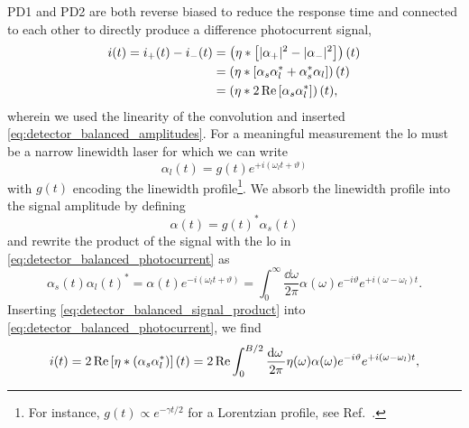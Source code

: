 PD1 and PD2 are both reverse biased to reduce the response time and connected to each other to directly produce a difference photocurrent signal,
\begin{equation}
	\begin{split}
		i(t)
		=
		i_+(t)
		-
		i_-(t)
		&=
		\left(
			\eta
			\ast
			\left[
				\lvert\alpha_+\rvert^2
				-
				\lvert\alpha_-\rvert^2
			\right]		
		\right)(t)
		\\
		&=
		\left(
			\eta
			\ast
			\left[
				\alpha_s
				\alpha_l^*
				+
				\alpha_s^*
				\alpha_l
			\right]
		\right)(t)
		\\
		&=
		\left(
			\eta
			\ast
			2\operatorname{Re}\left[
				\alpha_s
				\alpha_l^*
			\right]
		\right)(t)
		,
	\end{split}
	\label{eq:detector_balanced_photocurrent}
\end{equation}
wherein we used the linearity of the convolution and inserted \cref{eq:detector_balanced_amplitudes}.
For a meaningful measurement the \gls{lo} must be a narrow linewidth laser for which we can write
\begin{equation}
	\alpha_l(t)
	=
	g(t)
	e^{+i(\omega_lt+\vartheta)}
	\label{eq:detector_balanced_lo}
\end{equation}
with $g(t)$ encoding the linewidth profile\footnote{For instance, $g(t)\propto e^{-\gamma t/2}$ for a Lorentzian profile, see Ref.~\cite{Demtroeder2014}.}.
We absorb the linewidth profile into the signal amplitude by defining
\begin{equation}
	\alpha(t)
	=
	g(t)^*
	\alpha_s(t)
\end{equation}
and rewrite the product of the signal with the \gls{lo} in \cref{eq:detector_balanced_photocurrent} as
\begin{equation}
	\alpha_s(t)
	\alpha_l(t)^*
	=
	\alpha(t)
	e^{-i(\omega_lt+\vartheta)}
	=
	\int_0^{\infty}
	\frac{\dd{\omega}}{2\pi}
	\alpha(\omega)
	e^{-i\vartheta}
	e^{+i(\omega-\omega_l) t}
	.
	\label{eq:detector_balanced_signal_product}
\end{equation}
Inserting \cref{eq:detector_balanced_signal_product} into \cref{eq:detector_balanced_photocurrent}, we find
\begin{equation}
	\begin{split}
		i(t)
		=
		2\Re\left[
			\eta
			\conv
			(\alpha_s\alpha_l^*)
		\right](t)
		=
		2\Re
		\int_0^{B/2}
		\frac{\dd{\omega}}{2\pi}
		\eta(\omega)
		\alpha(\omega)
		e^{-i\vartheta}
		e^{+i(\omega-\omega_l) t}
		,
	\end{split}
	\label{eq:detector_balanced_photocurrent_final}
\end{equation}
